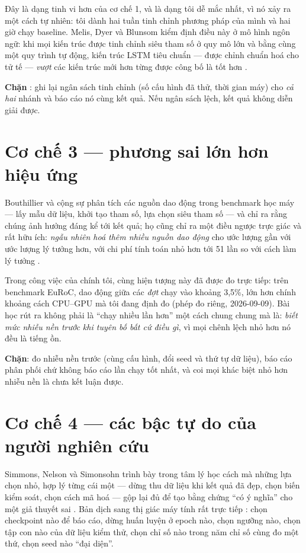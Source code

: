 \documentclass[../hieu-suat.tex]{subfiles}
\begin{document}
Đây là dạng tinh vi hơn của cơ chế 1, và là dạng tôi dễ mắc nhất, vì nó xảy ra một cách tự nhiên: tôi dành hai tuần tinh chỉnh phương pháp của mình và hai giờ chạy baseline. Melis, Dyer và Blunsom \cite{melis2018} kiểm định điều này ở mô hình ngôn ngữ: khi mọi kiến trúc được tinh chỉnh siêu tham số ở quy mô lớn và bằng cùng một quy trình tự động, kiến trúc LSTM tiêu chuẩn --- được chỉnh chuẩn hoá cho tử tế --- \emph{vượt} các kiến trúc mới hơn từng được công bố là tốt hơn \nD{}.

\textbf{Chặn} \nM{}: ghi lại ngân sách tinh chỉnh (số cấu hình đã thử, thời gian máy) cho \emph{cả hai} nhánh và báo cáo nó cùng kết quả. Nếu ngân sách lệch, kết quả không diễn giải được.

\section{Cơ chế 3 --- phương sai lớn hơn hiệu ứng}

Bouthillier và cộng sự \cite{bouthillier2021} phân tích các nguồn dao động trong benchmark học máy --- lấy mẫu dữ liệu, khởi tạo tham số, lựa chọn siêu tham số --- và chỉ ra rằng chúng ảnh hưởng đáng kể tới kết quả; họ cũng chỉ ra một điều ngược trực giác và rất hữu ích: \emph{ngẫu nhiên hoá thêm nhiều nguồn dao động} cho ước lượng gần với ước lượng lý tưởng hơn, với chi phí tính toán nhỏ hơn tới 51 lần so với cách làm lý tưởng \nD{}.

Trong công việc của chính tôi, cùng hiện tượng này đã được đo trực tiếp: trên benchmark EuRoC, dao động giữa các \emph{đợt} chạy vào khoảng 3,5\%, lớn hơn chính khoảng cách CPU--GPU mà tôi đang định đo \nD{} (phép đo riêng, 2026-09-09). Bài học rút ra không phải là ``chạy nhiều lần hơn'' một cách chung chung mà là: \emph{biết mức nhiễu nền trước khi tuyên bố bất cứ điều gì}, vì mọi chênh lệch nhỏ hơn nó đều là tiếng ồn.

\textbf{Chặn}: đo nhiễu nền trước (cùng cấu hình, đổi seed và thứ tự dữ liệu), báo cáo phân phối chứ không báo cáo lần chạy tốt nhất, và coi mọi khác biệt nhỏ hơn nhiễu nền là chưa kết luận được.

\section{Cơ chế 4 --- các bậc tự do của người nghiên cứu}

Simmons, Nelson và Simonsohn \cite{simmons2011} trình bày trong tâm lý học cách mà những lựa chọn nhỏ, hợp lý từng cái một --- dừng thu dữ liệu khi kết quả đã đẹp, chọn biến kiểm soát, chọn cách mã hoá --- gộp lại đủ để tạo bằng chứng ``có ý nghĩa'' cho một giả thuyết sai \nD{}. Bản dịch sang thị giác máy tính rất trực tiếp \nM{}: chọn checkpoint nào để báo cáo, dừng huấn luyện ở epoch nào, chọn ngưỡng nào, chọn tập con nào của dữ liệu kiểm thử, chọn chỉ số nào trong năm chỉ số cùng đo một thứ, chọn seed nào ``đại diện''.
\end{document}
